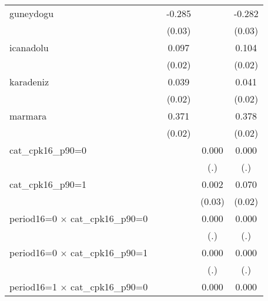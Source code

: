 {\begin{tabular}{l*{4}{c}}
guneydogu           &                     &      -0.285\sym{***}&                     &      -0.282\sym{***}\\
                    &                     &      (0.03)         &                     &      (0.03)         \\
icanadolu           &                     &       0.097\sym{***}&                     &       0.104\sym{***}\\
                    &                     &      (0.02)         &                     &      (0.02)         \\
karadeniz           &                     &       0.039         &                     &       0.041         \\
                    &                     &      (0.02)         &                     &      (0.02)         \\
marmara             &                     &       0.371\sym{***}&                     &       0.378\sym{***}\\
                    &                     &      (0.02)         &                     &      (0.02)         \\
cat\_cpk16\_p90=0     &                     &                     &       0.000         &       0.000         \\
                    &                     &                     &         (.)         &         (.)         \\
cat\_cpk16\_p90=1     &                     &                     &       0.002         &       0.070\sym{**} \\
                    &                     &                     &      (0.03)         &      (0.02)         \\
period16=0 $\times$ cat\_cpk16\_p90=0&                     &                     &       0.000         &       0.000         \\
                    &                     &                     &         (.)         &         (.)         \\
period16=0 $\times$ cat\_cpk16\_p90=1&                     &                     &       0.000         &       0.000         \\
                    &                     &                     &         (.)         &         (.)         \\
period16=1 $\times$ cat\_cpk16\_p90=0&                     &                     &       0.000         &       0.000         \\

\end{tabular}}
